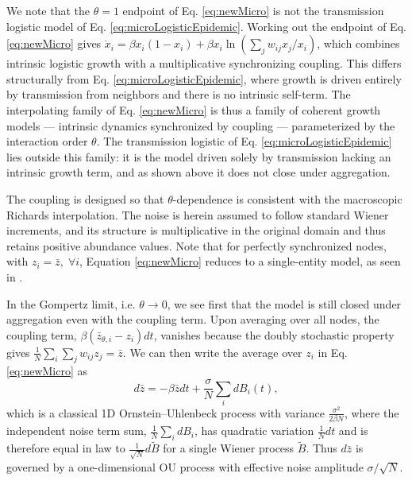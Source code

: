 \documentclass{article}
\begin{document}
We note that the $\theta = 1$ endpoint of Eq. \ref{eq:newMicro} is not the transmission logistic model of Eq. \ref{eq:microLogisticEpidemic}. Working out the endpoint of Eq. \ref{eq:newMicro} gives $\dot{x}_i = \beta x_i(1-x_i) + \beta x_i\ln(\sum_j w_{ij}x_j/x_i)$, which combines intrinsic logistic growth with a multiplicative synchronizing coupling. This differs structurally from Eq. \ref{eq:microLogisticEpidemic}, where growth is driven entirely by transmission from neighbors and there is no intrinsic self-term. The interpolating family of Eq. \ref{eq:newMicro} is thus a family of coherent growth models — intrinsic dynamics synchronized by coupling — parameterized by the interaction order $\theta$. The transmission logistic of Eq. \ref{eq:microLogisticEpidemic} lies outside this family: it is the model driven solely by transmission lacking an intrinsic growth term, and as shown above it does not close under aggregation.

The coupling is designed so that $\theta$-dependence is consistent with the macroscopic Richards interpolation. The noise is herein assumed to follow standard Wiener increments, and its structure is multiplicative in the original domain and thus retains positive abundance values. Note that for perfectly synchronized nodes, with $z_i = \bar{z}, \;\forall i$, Equation \ref{eq:newMicro} reduces to a single-entity model, as seen in \citet{de2014stochastic}.

In the Gompertz limit, i.e. $\theta \rightarrow 0$, we see first that the model is still closed under aggregation even with the coupling term. Upon averaging over all nodes, the coupling term, $\beta(\bar{z}_{\theta,i} - z_i)dt$, vanishes because the doubly stochastic property gives $\frac{1}{N}\sum_i\sum_jw_{ij}z_j=\bar{z}$. We can then write the average over $z_i$ in Eq. \ref{eq:newMicro} as
\begin{equation}
  \label{eq:newMicro2}
  d\bar{z} = -\beta \bar{z}dt + \frac{\sigma}{N}\sum_i dB_i(t),
\end{equation}
which is a classical 1D Ornstein–Uhlenbeck process with variance $\frac{\sigma^2}{2\beta N}$, where the independent noise term sum, $\frac{1}{N}\sum_i dB_i$, has quadratic variation $\frac{1}{N}dt$ and is therefore equal in law to $\frac{1}{\sqrt{N}}d\tilde{B}$ for a single Wiener process $\tilde{B}$. Thus $d\bar{z}$ is governed by a one-dimensional OU process with effective noise amplitude $\sigma/\sqrt{N}$.
\end{document}
